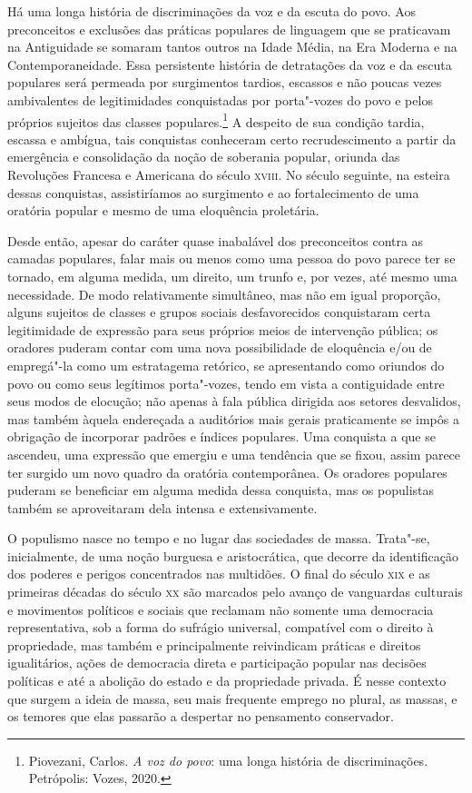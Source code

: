 Há uma longa história de discriminações da voz e da escuta do povo. Aos
preconceitos e exclusões das práticas populares de linguagem que se
praticavam na Antiguidade se somaram tantos outros na Idade Média, na
Era Moderna e na Contemporaneidade. Essa persistente história de
detratações da voz e da escuta populares será permeada por surgimentos
tardios, escassos e não poucas vezes ambivalentes de legitimidades
conquistadas por porta"-vozes do povo e pelos próprios sujeitos das
classes populares.\footnote{Piovezani, Carlos. \emph{A voz do povo}: uma
  longa história de discriminações. Petrópolis: Vozes, 2020.} A
despeito de sua condição tardia, escassa e ambígua, tais conquistas
conheceram certo recrudescimento a partir da emergência e consolidação
da noção de soberania popular, oriunda das Revoluções Francesa e
Americana do século \textsc{xviii}. No século seguinte, na esteira dessas
conquistas, assistiríamos ao surgimento e ao fortalecimento de uma
oratória popular e mesmo de uma eloquência proletária.

Desde então, apesar do caráter quase inabalável dos preconceitos contra
as camadas populares, falar mais ou menos como uma pessoa do povo parece
ter se tornado, em alguma medida, um direito, um trunfo e, por vezes,
até mesmo uma necessidade. De modo relativamente simultâneo, mas não em
igual proporção, alguns sujeitos de classes e grupos sociais
desfavorecidos conquistaram certa legitimidade de expressão para seus
próprios meios de intervenção pública; os oradores puderam contar com
uma nova possibilidade de eloquência e/ou de empregá"-la como um
estratagema retórico, se apresentando como oriundos do povo ou como seus
legítimos porta"-vozes, tendo em vista a contiguidade entre seus modos de
elocução; não apenas à fala pública dirigida aos setores desvalidos, mas
também àquela endereçada a auditórios mais gerais praticamente se impôs
a obrigação de incorporar padrões e índices populares. Uma conquista a
que se ascendeu, uma expressão que emergiu e uma tendência que se fixou,
assim parece ter surgido um novo quadro da oratória contemporânea. Os
oradores populares puderam se beneficiar em alguma medida dessa
conquista, mas os populistas também se aproveitaram dela intensa e
extensivamente.

O populismo nasce no tempo e no lugar das sociedades de massa. Trata"-se,
inicialmente, de uma noção burguesa e aristocrática, que decorre da
identificação dos poderes e perigos concentrados nas multidões. O final
do século \textsc{xix} e as primeiras décadas do século \textsc{xx} são marcados pelo
avanço de vanguardas culturais e movimentos políticos e sociais que
reclamam não somente uma democracia representativa, sob a forma do
sufrágio universal, compatível com o direito à propriedade, mas também e
principalmente reivindicam práticas e direitos igualitários, ações de
democracia direta e participação popular nas decisões políticas e até a
abolição do estado e da propriedade privada. É nesse contexto que surgem
a ideia de massa, seu mais frequente emprego no plural, as massas, e os
temores que elas passarão a despertar no pensamento conservador.

